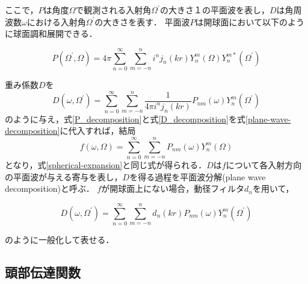 \documentclass[a4paper]{jsarticle}
\begin{document}
ここで，$P$は角度$\Omega$で観測される入射角$\Omega^\prime$の大きさ１の平面波を表し，$D$は角周波数$\omega$における入射角$\Omega^\prime$の大きさを表す．
平面波$P$は開球面において以下のように球面調和展開できる．

\begin{equation}
    \label{P_decomposition}
    P\left(\Omega^{\prime}, \Omega\right)=4 \pi \sum_{n=0}^{\infty} \sum_{m=-n}^{n} i^{n} j_{n}(k r) Y_{n}^{m}(\Omega) Y_{n}^{m *}\left(\Omega^{\prime}\right)
\end{equation}

重み係数$D$を
\begin{equation}
    \label{D_decomposition}
    D\left(\omega, \Omega^{\prime}\right)=\sum_{n=0}^{\infty} \sum_{m=-n}^{n} \frac{1}{4 \pi i^{n} j_{n}(k r)} P_{n m}(\omega) Y_{n}^{m}\left(\Omega^{\prime}\right)
\end{equation}
のように与え，式\ref{P_decomposition}と式\ref{D_decomposition}を式\ref{plane-wave-decomposition}に代入すれば，結局
$$
    f(\omega, \Omega)=\sum_{n=0}^{\infty} \sum_{m=-n}^{n} P_{n m}(\omega) Y_{n}^{m}(\Omega)
$$
となり，式\ref{spherical-expansion}と同じ式が得られる．$D$は$f$について各入射方向の平面波が与える寄与を表し，$D$を得る過程を平面波分解(plane wave decomposition)と呼ぶ．
$f$が開球面上にない場合，動径フィルタ$d_n$を用いて，

$$
    D\left(\omega, \Omega^{\prime}\right)=\sum_{n=0}^{\infty} \sum_{m=-n}^{n} d_{n}(k r) P_{n m}(\omega) Y_{n}^{m}\left(\Omega^{\prime}\right)
$$

のように一般化して表せる．

\subsection{頭部伝達関数}
\end{document}
